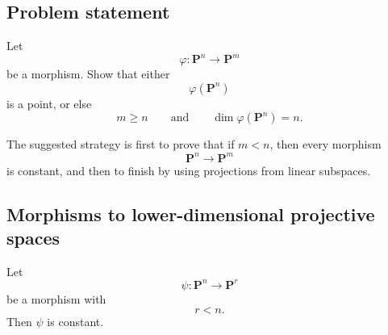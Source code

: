 
\subsection*{Problem statement}

Let
\[
\varphi:\mathbf{P}^n\longrightarrow \mathbf{P}^m
\]
be a morphism. Show that either
\[
\varphi(\mathbf{P}^n)
\]
is a point, or else
\[
m\geq n
\qquad\text{and}\qquad
\dim \varphi(\mathbf{P}^n)=n.
\]

The suggested strategy is first to prove that if \(m<n\), then every morphism
\[
\mathbf{P}^n\longrightarrow \mathbf{P}^m
\]
is constant, and then to finish by using projections from linear subspaces.

\subsection{Morphisms to lower-dimensional projective spaces}

\begin{lemma}
	Let
	\[
	\psi:\mathbf{P}^n\longrightarrow \mathbf{P}^r
	\]
	be a morphism with
	\[
	r<n.
	\]
	Then \(\psi\) is constant.
\end{lemma}

